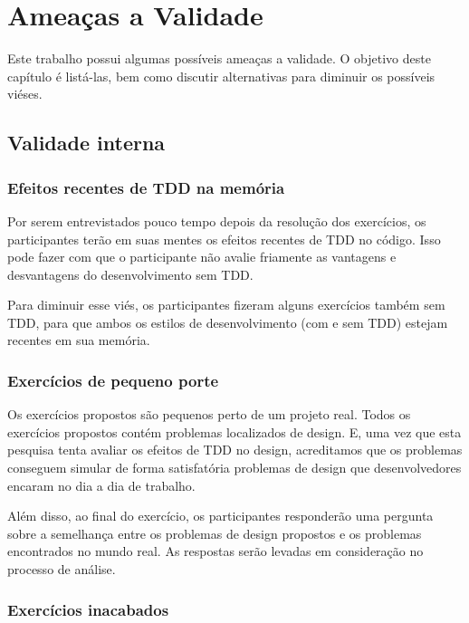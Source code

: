 \chapter{Ameaças a Validade}
\label{cap:ameacas}

Este trabalho possui algumas possíveis ameaças a validade. O objetivo
deste capítulo é listá-las, bem como discutir alternativas para diminuir
os possíveis viéses.

\section{Validade interna}

\subsection{Efeitos recentes de TDD na memória}

Por serem entrevistados pouco tempo depois da resolução dos exercícios, os participantes terão
em suas mentes os efeitos recentes de TDD no código. Isso pode fazer com que o participante
não avalie friamente as vantagens e desvantagens do desenvolvimento sem TDD. 

Para diminuir esse viés, os participantes fizeram alguns exercícios também
sem TDD, para que ambos os estilos de desenvolvimento (com e sem TDD) estejam
recentes em sua memória.

\subsection{Exercícios de pequeno porte}

Os exercícios propostos são pequenos perto de um projeto real. Todos os exercícios propostos contém
problemas localizados de design. E, uma vez que esta pesquisa tenta avaliar os efeitos de TDD no design, 
acreditamos que os problemas conseguem simular de forma satisfatória
problemas de design que desenvolvedores encaram no dia a dia de trabalho.

Além disso, ao final do exercício, os participantes responderão uma pergunta sobre a semelhança
entre os problemas de design propostos e os problemas encontrados no mundo real.
As respostas serão levadas em consideração no processo de análise.

\subsection{Exercícios inacabados}

